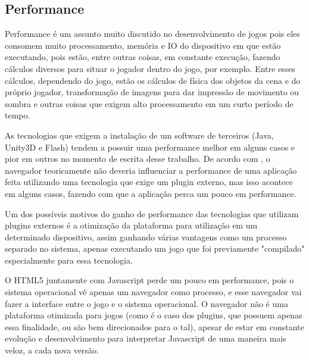 \subsection{Performance}

Performance é um assunto muito discutido no desenvolvimento de jogos
pois eles consomem muito processamento, memória e IO do dispositivo em que estão
executando, pois estão, entre outras coisas, em constante execução, fazendo
cálculos diversos para situar o jogador dentro do jogo, por exemplo.
Entre esses cálculos, dependendo do jogo, estão os cálculos de física dos
objetos da cena e do próprio jogador, transformação de imagens para
dar impressão de movimento ou sombra e outras coisas que exigem alto
processamento em um curto período de tempo.

As tecnologias que exigem a instalação de um software de terceiros
(Java, Unity3D e Flash) tendem a possuir uma performance melhor em alguns casos
e pior em outros no momento de escrita desse trabalho. De acordo com ,
o navegador teoricamente não deveria influenciar a performance de uma aplicação
feita utilizando uma tecnologia que exige um plugin externo, mas isso acontece
em alguns casos, fazendo com que a aplicação perca um pouco em performance.

Um dos possíveis motivos do ganho de performance das tecnologias que
utilizam plugins externos é a otimização da plataforma para utilização em um determinado
dispositivo, assim ganhando várias vantagens como um processo separado no
sistema, apenas executando um jogo que foi previamente "compilado"
especialmente para essa tecnologia.

O HTML5 juntamente com Javascript perde um pouco em performance, pois
o sistema operacional vê apenas um navegador como processo, e esse
navegador vai fazer a interface entre o jogo e o sistema operacional.
O navegador não é uma plataforma otimizada para jogos (como é o caso
dos plugins, que possuem apenas essa finalidade, ou são bem
direcionados para o tal), apesar de estar em constante evolução e
desenvolvimento para interpretar Javascript de uma maneira mais veloz,
a cada nova versão.

